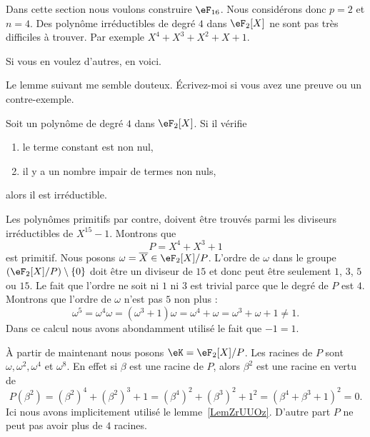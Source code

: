 Dans cette section nous voulons construire \( \eF_{16}\). Nous considérons donc \( p=2\) et \( n=4\). Des polynôme irréductibles de degré \( 4\) dans \( \eF_2[X]\) ne sont pas très difficiles à trouver. Par exemple \( X^4+X^3+X^2+X+1\).

Si vous en voulez d'autres, en voici.

\begin{probleme}
	Le lemme suivant me semble douteux. Écrivez-moi si vous avez une preuve ou un contre-exemple.
\end{probleme}

\begin{lemma}        \label{LEMooTBROooANstIL}
	Soit un polynôme de degré \( 4\) dans \( \eF_2[X]\). Si il vérifie
	\begin{enumerate}
		\item
		      le terme constant est non nul,
		\item
		      il y a un nombre impair de termes non nuls,
	\end{enumerate}
	alors il est irréductible.
\end{lemma}

Les polynômes primitifs par contre, doivent être trouvés parmi les diviseurs irréductibles de \( X^{15}-1\). Montrons que
\begin{equation}
	P=X^4+X^3+1
\end{equation}
est primitif. Nous posons \( \omega=\overline X\in \eF_2[X]/P\). L'ordre de \( \omega\) dans le groupe \( (\eF_2[X]/P)\setminus\{ 0 \} \) doit être un diviseur de \( 15\) et donc peut être seulement \( 1\), \( 3\), \( 5\) ou \( 15\). Le fait que l'ordre ne soit ni \( 1\) ni \( 3\) est trivial parce que le degré de \( P\) est \( 4\). Montrons que l'ordre de \( \omega\) n'est pas \( 5\) non plus :
\begin{equation}
	\omega^5=\omega^4\omega=(\omega^3+1)\omega=\omega^4+\omega=\omega^3+\omega+1\neq 1.
\end{equation}
Dans ce calcul nous avons abondamment utilisé le fait que \( -1=1\).

À partir de maintenant nous posons \( \eK=\eF_2[X]/P\). Les racines de \( P\) sont \( \omega,\omega^2,\omega^4\) et \( \omega^8\). En effet si \( \beta\) est une racine de \( P\), alors \( \beta^2\) est une racine en vertu de
\begin{equation}
	P(\beta^2)=(\beta^2)^4+(\beta^2)^3+1=(\beta^4)^2+(\beta^3)^2+1^2=(\beta^4+\beta^3+1)^2=0.
\end{equation}
Ici nous avons implicitement utilisé le lemme~\ref{LemZrUUOz}. D'autre part \( P\) ne peut pas avoir plus de \( 4\) racines.

